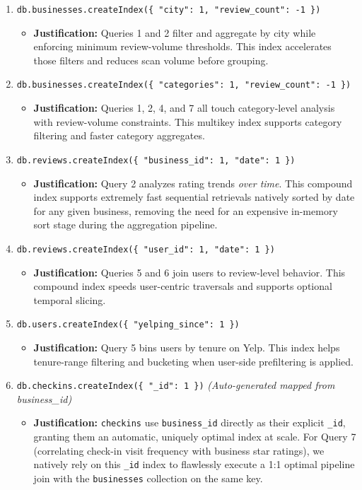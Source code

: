 \documentclass[11pt,a4paper]{article}
\begin{document}
\begin{enumerate}
    \item \texttt{db.businesses.createIndex(\{ "city": 1, "review\_count": -1 \})}
    \begin{itemize}
        \item \textbf{Justification:} Queries 1 and 2 filter and aggregate by city while enforcing minimum review-volume thresholds. This index accelerates those filters and reduces scan volume before grouping.
    \end{itemize}
    \item \texttt{db.businesses.createIndex(\{ "categories": 1, "review\_count": -1 \})}
    \begin{itemize}
        \item \textbf{Justification:} Queries 1, 2, 4, and 7 all touch category-level analysis with review-volume constraints. This multikey index supports category filtering and faster category aggregates.
    \end{itemize}
    \item \texttt{db.reviews.createIndex(\{ "business\_id": 1, "date": 1 \})}
    \begin{itemize}
        \item \textbf{Justification:} Query 2 analyzes rating trends \textit{over time}. This compound index supports extremely fast sequential retrievals natively sorted by date for any given business, removing the need for an expensive in-memory sort stage during the aggregation pipeline.
    \end{itemize}
    \item \texttt{db.reviews.createIndex(\{ "user\_id": 1, "date": 1 \})}
    \begin{itemize}
        \item \textbf{Justification:} Queries 5 and 6 join users to review-level behavior. This compound index speeds user-centric traversals and supports optional temporal slicing.
    \end{itemize}
    \item \texttt{db.users.createIndex(\{ "yelping\_since": 1 \})}
    \begin{itemize}
        \item \textbf{Justification:} Query 5 bins users by tenure on Yelp. This index helps tenure-range filtering and bucketing when user-side prefiltering is applied.
    \end{itemize}
    \item \texttt{db.checkins.createIndex(\{ "\_id": 1 \})} \textit{(Auto-generated mapped from business\_id)}
    \begin{itemize}
        \item \textbf{Justification:} \texttt{checkins} use \texttt{business\_id} directly as their explicit \texttt{\_id}, granting them an automatic, uniquely optimal index at scale. For Query 7 (correlating check-in visit frequency with business star ratings), we natively rely on this \texttt{\_id} index to flawlessly execute a 1:1 optimal pipeline join with the \texttt{businesses} collection on the same key.
    \end{itemize}
\end{enumerate}
\end{document}
